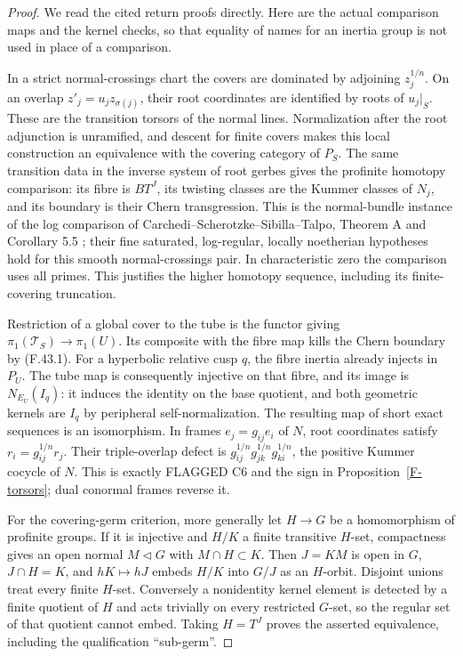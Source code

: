 \documentclass[11pt,oneside]{article}
\begin{document}
\begin{proof}
We read the cited return proofs directly. Here are the actual
comparison maps and the kernel checks, so that equality of names
for an inertia group is not used in place of a comparison.

In a strict normal-crossings chart the covers are dominated by
adjoining $z_j^{1/n}$. On an overlap
$z'_j=u_jz_{\sigma(j)}$, their root coordinates are identified by
roots of $u_j|_S$. These are the transition torsors of the normal
lines. Normalization after the root adjunction is unramified,
and descent for finite covers makes this local construction an
equivalence with the covering category of $P_S$. The same
transition data in the inverse system of root gerbes gives the
profinite homotopy comparison: its fibre is $BT^J$, its twisting
classes are the Kummer classes of $N_j$, and its boundary is
their Chern transgression. This is the normal-bundle instance
of the log comparison of Carchedi--Scherotzke--Sibilla--Talpo,
Theorem A and Corollary 5.5 \cite{F-CSST}; their fine saturated,
log-regular, locally noetherian hypotheses hold for this smooth
normal-crossings pair. In characteristic zero the comparison
uses all primes. This justifies the higher homotopy sequence,
including its finite-covering truncation.

Restriction of a global cover to the tube is the functor
giving $\pi_1(\mathcal T_S)\to\pi_1(U)$. Its composite with
the fibre map kills the Chern boundary by (F.43.1).
For a hyperbolic relative cusp $q$, the fibre inertia already
injects in $P_U$. The tube map is consequently injective on
that fibre, and its image is $N_{E_U}(I_q)$: it induces the
identity on the base quotient, and both geometric kernels
are $I_q$ by peripheral self-normalization. The resulting
map of short exact sequences is an isomorphism. In frames
$e_j=g_{ij}e_i$ of $N$, root coordinates satisfy
$r_i=g_{ij}^{1/n}r_j$. Their triple-overlap defect is
$g_{ij}^{1/n}g_{jk}^{1/n}g_{ki}^{1/n}$, the positive Kummer
cocycle of $N$. This is exactly FLAGGED C6 and the sign in
Proposition~\ref{F-torsors}; dual conormal frames reverse it.

For the covering-germ criterion, more generally let
$H\to G$ be a homomorphism of profinite groups. If it is
injective and $H/K$ a finite transitive $H$-set, compactness
gives an open normal $M\lhd G$ with $M\cap H\subset K$.
Then $J=KM$ is open in $G$, $J\cap H=K$, and
$hK\mapsto hJ$ embeds $H/K$ into $G/J$ as an $H$-orbit.
Disjoint unions treat every finite $H$-set. Conversely a
nonidentity kernel element is detected by a finite quotient
of $H$ and acts trivially on every restricted $G$-set, so
the regular set of that quotient cannot embed. Taking
$H=T^J$ proves the asserted equivalence, including the
qualification ``sub-germ''.


\end{proof}
\end{document}
